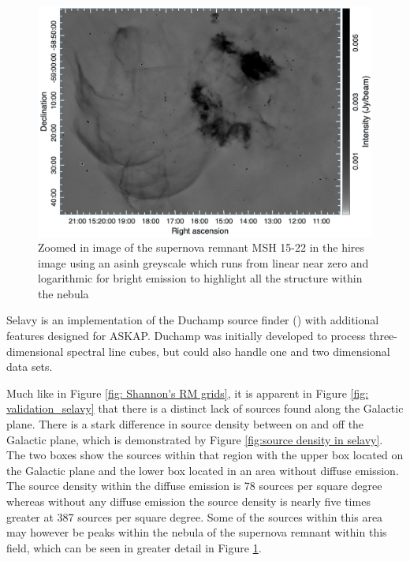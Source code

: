 \begin{figure}
    \centering
    \includegraphics[width=\linewidth]{Thesis_Template/Figures/EMU_1505-60_hi.fits-image-2025-04-24-17-38-58.png}
    \caption[Supernova remnant MSH 15-22]{Zoomed in image of the supernova remnant MSH 15-22 in the hires image using an asinh greyscale which runs from linear near zero and logarithmic for bright emission to highlight all the structure within the nebula}
    \label{fig:sn remnant}
\end{figure}

Selavy is an implementation of the Duchamp source finder (\cite{Duchamp_Whiting_2012}) with additional features designed for ASKAP. Duchamp was initially developed to process three-dimensional spectral line cubes, but could also handle one and two dimensional data sets. 

Much like in Figure \ref{fig: Shannon's RM grids}, it is apparent in Figure \ref{fig: validation_selavy} that there is a distinct lack of sources found along the Galactic plane. There is a stark difference in source density between on and off the Galactic plane, which is demonstrated by Figure \ref{fig:source density in selavy}. The two boxes show the sources within that region with the upper box located on the Galactic plane and the lower box located in an area without diffuse emission. The source density within the diffuse emission is 78 sources per square degree whereas without any diffuse emission the source density is nearly five times greater at 387 sources per square degree. Some of the sources within this area may however be peaks within the nebula of the supernova remnant within this field, which can be seen in greater detail in Figure \ref{fig:sn remnant}.

